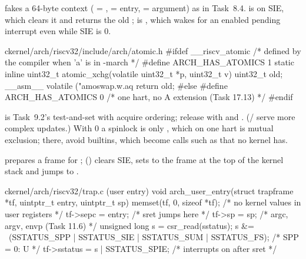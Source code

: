 \documentclass[11pt,a4paper]{article}
\begin{document}
 fakes a 64-byte context ( = ,  = entry,  =
argument) as in Task~8.4.  is  on SIE, which clears it and returns the old ;
 is , which wakes for an enabled pending interrupt even while SIE is 0.

\begin{lst}{c}{kernel/arch/riscv32/include/arch/atomic.h}
#ifdef __riscv_atomic                   /* defined by the compiler when 'a' is in -march */
#define ARCH_HAS_ATOMICS 1
static inline uint32_t atomic_xchg(volatile uint32_t *p, uint32_t v)
{
    uint32_t old;
    __asm__ volatile ("amoswap.w.aq %
    return old;
}
#else
#define ARCH_HAS_ATOMICS 0              /* one hart, no A extension (Task 17.13) */
#endif
\end{lst}

 is Task~9.2's test-and-set with acquire ordering; release with  and
. (/ serve more complex updates.) With  0 a spinlock
is only , which on one hart is mutual exclusion; there, avoid  builtins, which become calls
such as  that no kernel has.

 prepares a frame for ;  () clears SIE, sets
 to the frame at the top of the kernel stack and jumps to .

\begin{lst}{c}{kernel/arch/riscv32/trap.c (user entry)}
void arch_user_entry(struct trapframe *tf, uintptr_t entry, uintptr_t sp)
{
    memset(tf, 0, sizeof *tf);              /* no kernel values in user registers */
    tf->sepc = entry;                       /* sret jumps here                    */
    tf->sp = sp;                            /* argc, argv, envp (Task 11.6)       */
    unsigned long s = csr_read(sstatus);
    s &= ~(SSTATUS_SPP | SSTATUS_SIE | SSTATUS_SUM | SSTATUS_FS);  /* SPP = 0: U */
    tf->sstatus = s | SSTATUS_SPIE;         /* interrupts on after sret           */
}
\end{lst}
\end{document}
